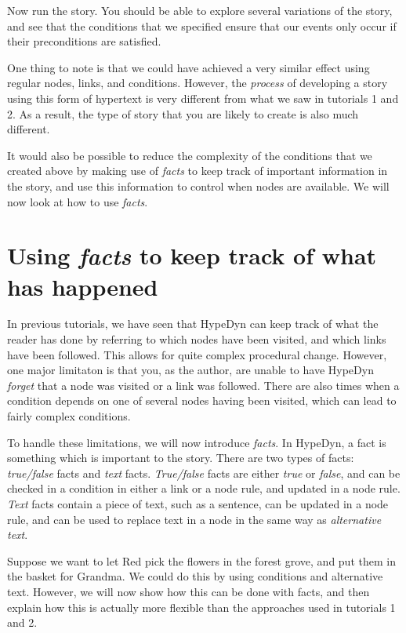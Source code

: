 \documentclass{article}
\begin{document}
Now run the story. You should be able to explore several variations of the
story, and see that the conditions that we specified ensure that our events
only occur if their preconditions are satisfied.

One thing to note is that we could have achieved a very similar effect using
regular nodes, links, and conditions. However, the \textit{process} of
developing a story using this form of hypertext is very different from what we
saw in tutorials 1 and 2. As a result, the type of story that you are likely to
create is also much different.

It would also be possible to reduce the complexity of the conditions that we
created above by making use of \textit{facts} to keep track of important
information in the story, and use this information to control when nodes are
available. We will now look at how to use \textit{facts}.

\section{Using \textit{facts} to keep track of what has happened}

In previous tutorials, we have seen that HypeDyn can keep track of what the
reader has done by referring to which nodes have been visited, and which links
have been followed. This allows for quite complex procedural change. However,
one major limitaton is that you, as the author, are unable to have HypeDyn
\textit{forget} that a node was visited or a link was followed. There are also
times when a condition depends on one of several nodes having been visited,
which can lead to fairly complex conditions.

To handle these limitations, we will now introduce \textit{facts}. In HypeDyn,
a fact is something which is important to the story. There are two types of
facts: \textit{true/false} facts and \textit{text} facts. \textit{True/false}
facts are either \textit{true} or \textit{false}, and can be checked in a
condition in either a link or a node rule, and updated in a node rule.
\textit{Text} facts contain a piece of text, such as a sentence, can be
updated in a node rule, and can be used to replace text in a node in the same
way as \textit{alternative text}.

Suppose we want to let Red pick the flowers in the forest grove, and put them
in the basket for Grandma. We could do this by using conditions and alternative
text. However, we will now show how this can be done with facts, and then
explain how this is actually more flexible than the approaches used in
tutorials 1 and 2.
\end{document}
